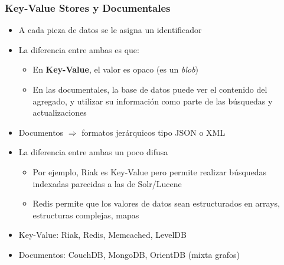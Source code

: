 \documentclass[14pt]{beamer}
\begin{document}
\begin{frame}[allowframebreaks]
  \frametitle{Key-Value Stores y Documentales}
\vspace*{-.9em}
\begin{itemize}
\item A cada pieza de datos se le asigna un identificador
\item La diferencia entre ambas es que:
  \begin{itemize}
  \item En {\bf Key-Value}, el valor es opaco (es un {\em blob\/})
  \item En las documentales, la base de datos puede ver el contenido del
    agregado, y utilizar su información como parte de las búsquedas y
    actualizaciones
\end{itemize}
\item Documentos $\Rightarrow$ formatos jerárquicos tipo JSON o XML
\framebreak
\item La diferencia entre ambas un poco difusa
  \begin{itemize}
  \item Por ejemplo, Riak es Key-Value pero permite realizar búsquedas
    indexadas parecidas a las de Solr/Lucene
\item Redis permite que los valores de datos sean estructurados en arrays,
  estructuras complejas, mapas
  \end{itemize}
\item Key-Value: Riak, Redis, Memcached, LevelDB
\item Documentos: CouchDB, MongoDB, OrientDB (mixta grafos)
\end{itemize}
\end{frame}
\end{document}
